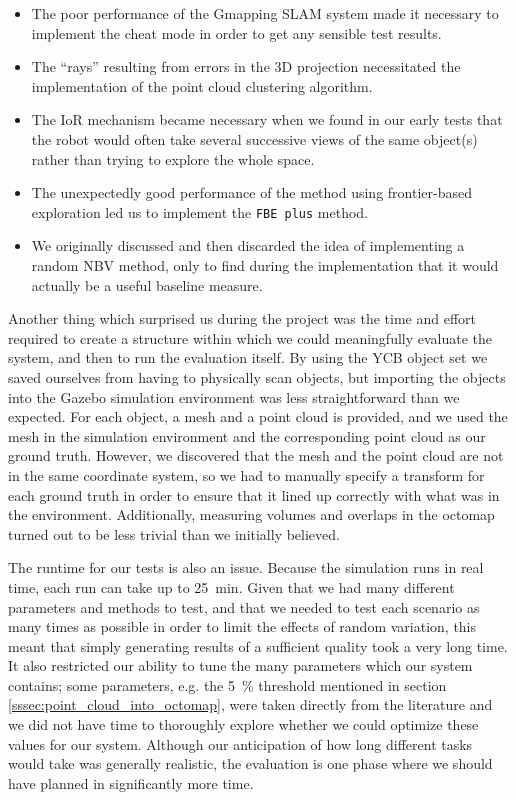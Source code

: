 \begin{itemize}
	\item The poor performance of the Gmapping SLAM system made it necessary to implement the cheat mode in order to get any sensible test results.
	\item The ``rays'' resulting from errors in the 3D projection necessitated the implementation of the point cloud clustering algorithm.
	\item The IoR mechanism became necessary when we found in our early tests that the robot would often take several successive views of the same object(s) rather than trying to explore the whole space.
	\item The unexpectedly good performance of the method using frontier-based exploration led us to implement the \texttt{FBE plus} method.
	\item We originally discussed and then discarded the idea of implementing a random NBV method, only to find during the implementation that it would actually be a useful baseline measure.
\end{itemize}


Another thing which surprised us during the project was the time and effort required to create a structure within which we could meaningfully evaluate the system, and then to run the evaluation itself.
By using the YCB object set we saved ourselves from having to physically scan objects, but importing the objects into the Gazebo simulation environment was less straightforward than we expected.
For each object, a mesh and a point cloud is provided, and we used the mesh in the simulation environment and the corresponding point cloud as our ground truth.
However, we discovered that the mesh and the point cloud are not in the same coordinate system, so we had to manually specify a transform for each ground truth in order to ensure that it lined up correctly with what was in the environment.
Additionally, measuring volumes and overlaps in the octomap turned out to be less trivial than we initially believed.

The runtime for our tests is also an issue. Because the simulation runs in real time, each run can take up to \SI{25}{\minute}.
Given that we had many different parameters and methods to test, and that we needed to test each scenario as many times as possible in order to limit the effects of random variation, this meant that simply generating results of a sufficient quality took a very long time.
It also restricted our ability to tune the many parameters which our system contains; some parameters, e.g. the \SI{5}{\percent} threshold mentioned in section \ref{sssec:point_cloud_into_octomap}, were taken directly from the literature and we did not have time to thoroughly explore whether we could optimize these values for our system.
Although our anticipation of how long different tasks would take was generally realistic, the evaluation is one phase where we should have planned in significantly more time.

